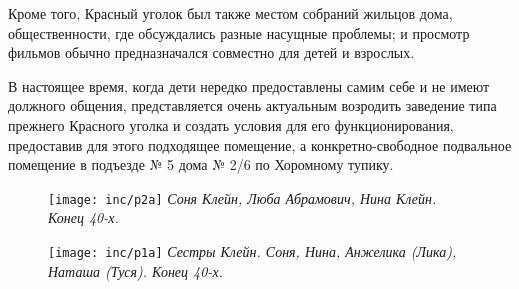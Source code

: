\vfill

Кроме того, Красный уголок был также местом собраний жильцов дома, общественности, где обсуждались разные насущные проблемы; и просмотр фильмов обычно предназначался совместно для детей и взрослых.

\vfill

В настоящее время, когда дети нередко предоставлены самим себе и не имеют должного общения, представляется очень актуальным возродить заведение типа прежнего Красного уголка и создать условия для его функционирования, предоставив для этого подходящее помещение, а конкретно-свободное подвальное помещение в подъезде № 5 дома № 2/6 по Хоромному тупику.


\begin{figure}[ht!]
    \begin{minipage}{100mm}
        \texttt{[image: inc/p2a]}
        \footnotesize{\textit{Соня Клейн, Люба Абрамович, Нина Клейн. Конец 40-х.}}
     \end{minipage}
\end{figure}

\vspace{10pt}

\begin{figure}[h!]
\begin{minipage}{100mm}
    \texttt{[image: inc/p1a]}
    \footnotesize{\textit{Сестры Клейн. Соня, Нина, Анжелика (Лика), Наташа (Туся). Конец 40-х.}}
\end{minipage}
\end{figure}
